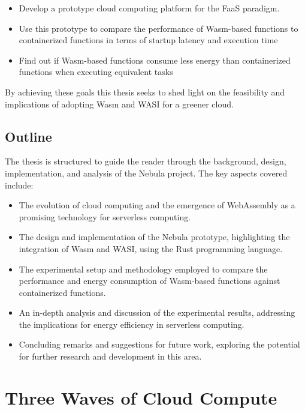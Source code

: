 \documentclass[
  table]{report}
\providecommand{\tightlist}{%
  \setlength{\itemsep}{0pt}\setlength{\parskip}{0pt}}
\begin{document}
\begin{itemize}
\tightlist
\item
  Develop a prototype cloud computing platform for the \ac{FaaS}
  paradigm.
\item
  Use this prototype to compare the performance of \ac{Wasm}-based
  functions to containerized functions in terms of startup latency and
  execution time
\item
  Find out if \ac{Wasm}-based functions consume less energy than
  containerized functions when executing equivalent tasks
\end{itemize}

By achieving these goals this thesis seeks to shed light on the
feasibility and implications of adopting \ac{Wasm} and \ac{WASI} for a
greener cloud.

\section{Outline}

The thesis is structured to guide the reader through the background,
design, implementation, and analysis of the Nebula project. The key
aspects covered include:

\begin{itemize}
\item
  The evolution of cloud computing and the emergence of WebAssembly as a
  promising technology for serverless computing.
\item
  The design and implementation of the Nebula prototype, highlighting
  the integration of Wasm and WASI, using the Rust programming language.
\item
  The experimental setup and methodology employed to compare the
  performance and energy consumption of \ac{Wasm}-based functions
  against containerized functions.
\item
  An in-depth analysis and discussion of the experimental results,
  addressing the implications for energy efficiency in serverless
  computing.
\item
  Concluding remarks and suggestions for future work, exploring the
  potential for further research and development in this area.
\end{itemize}

\newpage

\chapter{Three Waves of Cloud Compute}
\label{chap:three-waves}
\end{document}
